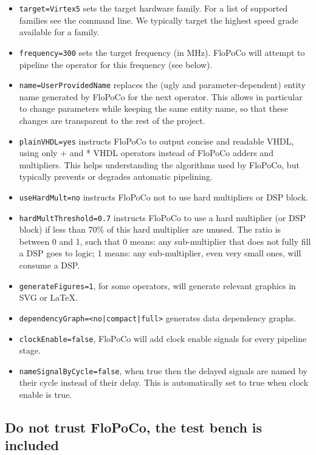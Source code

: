 \documentclass{article}
\begin{document}
\begin{itemize}
\item \texttt{target=Virtex5}  sets the target hardware family.
  	For a list of supported families see the command line. 
	We typically target the highest speed grade available for a family.
\item \texttt{frequency=300} sets the target frequency (in MHz). FloPoCo will attempt to pipeline the operator for this frequency (see  below).
\item \texttt{name=UserProvidedName} replaces the (ugly and parameter-dependent) entity name generated by FloPoCo for the next operator. 
This allows in particular to change parameters while keeping the same entity name, so that these changes are transparent to the rest of the project.
\item \texttt{plainVHDL=yes} instructs FloPoCo to output concise and readable VHDL, using only + and * VHDL operators instead of FloPoCo adders and multipliers.
This helps understanding the algorithms used by FloPoCo, but typically prevents or degrades automatic pipelining. 
\item \texttt{useHardMult=no} instructs FloPoCo not to use hard multipliers or DSP block.
\item \texttt{hardMultThreshold=0.7} instructs FloPoCo to use a hard multiplier (or DSP block) if less than 70\% of this hard multiplier are unused. 
 The ratio is between 0 and 1, such that
 0 means: any sub-multiplier that does not fully fill a DSP goes to logic; 
 1 means: any sub-multiplier, even very small ones, will consume a DSP.
\item \texttt{generateFigures=1}, for some operators, will generate relevant graphics in SVG or LaTeX.
\item \texttt{dependencyGraph=<no|compact|full>}  generates data dependency graphs. 
\item \texttt{clockEnable=false}, FloPoCo will add clock enable signals for every pipeline stage. 
\item \texttt{nameSignalByCycle=false}, when true then the delayed signals are named by their cycle instead of their delay. This is automatically set to true when clock enable is true. 

\end{itemize}


\subsection{Do not trust FloPoCo, the test bench is included}
\end{document}
